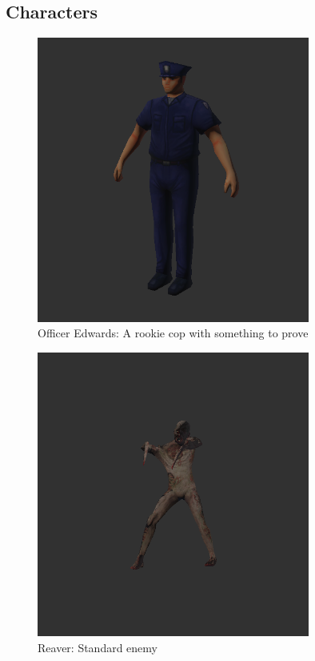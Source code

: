 \documentclass{article}
\begin{document}
    \newpage

    \subsection{Characters}
    \begin{figure}[h]
        \centering
        \includegraphics[width=0.8\textwidth]{Officer Edwards.png}
        \caption{Officer Edwards: A rookie cop with something to prove}
        \label{fig:edwards}
    \end{figure}
    \newpage
    \begin{figure}[h]
        \centering
        \includegraphics[width=0.8\textwidth]{Reaver.png}
        \caption{Reaver: Standard enemy}
        \label{fig:reaver}
    \end{figure}
\end{document}
